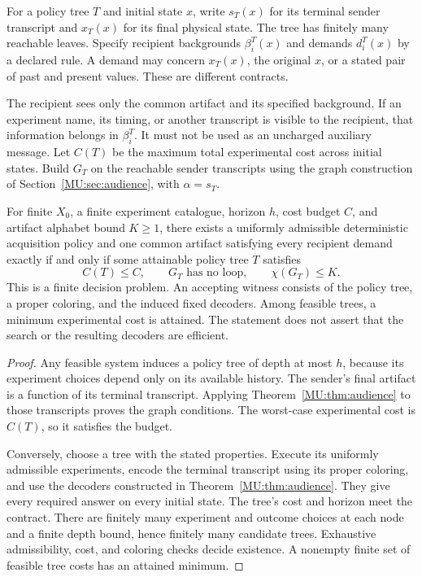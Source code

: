 For a policy tree $T$ and initial state $x$, write $s_T(x)$ for its terminal sender transcript and $x_T(x)$ for its final physical state. The tree has finitely many reachable leaves. Specify recipient backgrounds $\beta_i^T(x)$ and demands $d_i^T(x)$ by a declared rule. A demand may concern $x_T(x)$, the original $x$, or a stated pair of past and present values. These are different contracts.

The recipient sees only the common artifact and its specified background. If an experiment name, its timing, or another transcript is visible to the recipient, that information belongs in $\beta_i^T$. It must not be used as an uncharged auxiliary message. Let $C(T)$ be the maximum total experimental cost across initial states. Build $G_T$ on the reachable sender transcripts using the graph construction of Section~\ref{MU:sec:audience}, with $\alpha=s_T$.

\begin{MUtheorem}\label{MU:thm:joint-acquisition}
For finite $X_0$, a finite experiment catalogue, horizon $h$, cost budget $C$, and artifact alphabet bound $K\geq1$, there exists a uniformly admissible deterministic acquisition policy and one common artifact satisfying every recipient demand exactly if and only if some attainable policy tree $T$ satisfies
\[
C(T)\leq C,\qquad G_T\text{ has no loop},\qquad \chi(G_T)\leq K.
\]
This is a finite decision problem. An accepting witness consists of the policy tree, a proper coloring, and the induced fixed decoders. Among feasible trees, a minimum experimental cost is attained. The statement does not assert that the search or the resulting decoders are efficient.
\end{MUtheorem}
\begin{proof}
Any feasible system induces a policy tree of depth at most $h$, because its experiment choices depend only on its available history. The sender's final artifact is a function of its terminal transcript. Applying Theorem~\ref{MU:thm:audience} to those transcripts proves the graph conditions. The worst-case experimental cost is $C(T)$, so it satisfies the budget.

Conversely, choose a tree with the stated properties. Execute its uniformly admissible experiments, encode the terminal transcript using its proper coloring, and use the decoders constructed in Theorem~\ref{MU:thm:audience}. They give every required answer on every initial state. The tree's cost and horizon meet the contract. There are finitely many experiment and outcome choices at each node and a finite depth bound, hence finitely many candidate trees. Exhaustive admissibility, cost, and coloring checks decide existence. A nonempty finite set of feasible tree costs has an attained minimum.
\end{proof}

